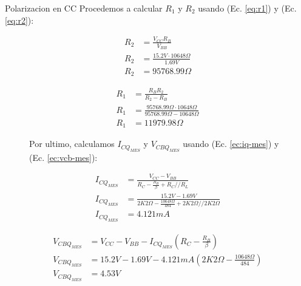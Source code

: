 \begin{frame}[allowframebreaks]{Polarizacion en CC}
  Procedemos a calcular $R_1$ y $R_2$ usando (Ec. \ref{eq:r1}) y (Ec. \ref{eq:r2}):
  \begin{figure}[!ht]
    \begin{minipage}{0.45\textwidth}
      \begin{align*}
        R_2 &= \frac{V_{CC} R_B}{V_{BB}}\\[6pt]
        R_2 &= \frac{15.2V \cdot 10648\Omega}{1.69V}\\[6pt]
        R_2 &= 95768.99\Omega
      \end{align*}
    \end{minipage}
    \hfill
    \begin{minipage}{0.45\textwidth}
      \begin{align*}
        R_1 &= \frac{R_B R_2}{R_2 - R_B}\\[6pt]
        R_1 &= \frac{95768.99\Omega \cdot 10648\Omega}{95768.99\Omega - 10648\Omega}\\[6pt]
        R_1 &= 11979.98\Omega
      \end{align*}
    \end{minipage}
  \end{figure}
  \begin{figure}[!ht]
    Por ultimo, calculamos $I_{CQ_{MES}}$ y $V_{CBQ_{MES}}$ usando (Ec. \ref{ec:iq-mes}) y (Ec. \ref{ec:vcb-mes}):
    \small
    \begin{minipage}{0.45\textwidth}
      \begin{align*}
        I_{CQ_{MES}} &= \frac{V_{CC} - V_{BB}}{R_C - \frac{R_B}{\beta} + R_C // R_L}\\[6pt]
        I_{CQ_{MES}} &= \frac{15.2V - 1.69V}{2K2\Omega - \frac{10648\Omega}{484} + 2K2\Omega // 2K2\Omega}\\[6pt]
        I_{CQ_{MES}} &= 4.121mA
      \end{align*}
    \end{minipage}
    \hfill
    \begin{minipage}{0.45\textwidth}
      \begin{align*}
        V_{CBQ_{MES}} &= V_{CC} - V_{BB} - I_{CQ_{MES}} \left(R_C - \frac{R_B}{\beta}\right)\\[6pt]
        V_{CBQ_{MES}} &= 15.2V - 1.69V - 4.121mA \left(2K2\Omega - \frac{10648\Omega}{484}\right)\\[6pt]
        V_{CBQ_{MES}} &= 4.53V
      \end{align*}
    \end{minipage}
  \end{figure}
\end{frame}

